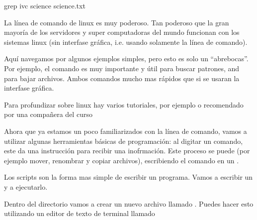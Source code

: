 \documentclass[letterpaper,10pt,english]{jupyterBook}
\begin{document}
\begin{sphinxVerbatim}[commandchars=\\\{\}]
\PYGZdl{} grep \PYGZhy{}ivc science science.txt
\end{sphinxVerbatim}

\begin{DUlineblock}{0em}
\item[] 
\end{DUlineblock}

\sphinxAtStartPar
La línea de comando de linux es muy poderoso. Tan poderoso que la gran mayoría de los servidores y super computadoras del mundo funcionan con los sistemas linux (sin interfase gráfica, i.e. usando solamente la línea de comando).

\sphinxAtStartPar
Aquí navegamos por algunos ejemplos simples, pero esto es solo un “abre\sphinxhyphen{}bocas”. Por ejemplo, el comando  es muy importante y útil para buscar patrones, and  para bajar archivos. Ambos comandos mucho mas rápidos que si se usaran la interfase gráfica.

\sphinxAtStartPar
Para profundizar sobre linux hay varios tutoriales, por ejemplo  o  recomendado por una compañera del curso

\begin{DUlineblock}{0em}
\item[] 
\end{DUlineblock}

\sphinxAtStartPar
Ahora que ya estamos un poco familiarizados con la línea de comando, vamos a utilizar algunas herramientas básicas de programación: al digitar un comando, este da una instrucción para recibir una inofrmación. Este proceso se puede  (por ejemplo mover, renombrar y copiar archivos), escribiendo el comando en un .

\sphinxAtStartPar
Los scripts son la forma mas simple de escribir un programa. Vamos a escribir un  y a ejecutarlo.

\sphinxAtStartPar
Dentro del directorio  vamos a crear un nuevo archivo llamado . Puedes hacer esto utilizando un  editor de texto de terminal llamado 
\end{document}
